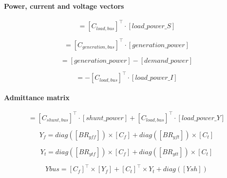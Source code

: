 \documentclass[nols,a4paper,twoside,notoc,fleqn]{tufte-book}
\begin{document}
\paragraph{Power, current and voltage vectors}

\begin{equation}
[demand\_power ]= [C_{load,bus}]^\top \cdot [load\_power\_S]
\end{equation}

\begin{equation}
[generation\_power ]= [C_{generation,bus}]^\top \cdot [generation\_power]
\end{equation}

\begin{equation}
[S_{bus}] = [generation\_power]  - [demand\_power]
\end{equation}


\begin{equation}
[I_{bus}] = - [C_{load,bus}]^\top \cdot [load\_power\_I]
\end{equation}

\paragraph{Admittance matrix}

\begin{equation}
[Ysh ]= [C_{shunt,bus}]^\top \cdot [shunt\_power] + [C_{load,bus}]^\top \cdot [load\_power\_Y]
\end{equation}



\begin{equation}
Y_f = diag([BR_{yff}]) \times [C_f] + diag([BR_{yft}]) \times [C_t]
\end{equation}

\begin{equation}
Y_t = diag([BR_{ytf}]) \times [C_f] + diag([BR_{ytt}]) \times [C_t]
\end{equation}


\begin{equation}
Ybus = [C_f]^\top \times [Y_f] + [C_t]^\top \times Y_t + diag([Ysh])
\label{eq:y_bus}
\end{equation}
\end{document}
